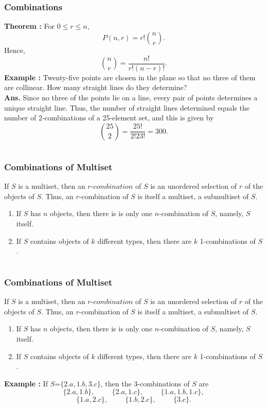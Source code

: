\documentclass{beamer}
\begin{document}
\section{}
 \begin{frame}
\frametitle{Combinations}
{\bf Theorem :} For  $ 0 \le r \le n,$
$$P(n,r)=r!{\binom{n}{r}}.$$ 
Hence,  $$\binom{n}{r} = \frac{n!}{r!(n-r)!}.$$
\pause
{\bf Example :} Twenty-five points are chosen in the plane so that no three of them are collinear. How many straight lines do they determine?\\
 {\bf Ans.} Since no three of the points lie on a line, every pair of points determines a unique straight line. Thus, the number of straight lines determined equals the number of 2-combinations of a 25-element set, and this is given by
   $$\binom{25}{2}=\frac{25!}{2!23!}=300.$$
\end{frame}

\section{}
 \begin{frame}
\frametitle{Combinations of Multiset}
If $S$ is a multiset, then an $r$-$combination$ of $S$ is an unordered selection of $r$ of the objects of $S$. Thus, an $r$-combination  of $S$ is itself a multiset, a submultiset of $S$.
\begin{enumerate}
\item If $S$ has $n$ objects, then there is is only one $n$-combination of $S$, namely, $S$ itself.
\item If $S$ contains objects of $k$ different types, then there are $k$ 1-combinations of $S$.
\end{enumerate}
\end{frame}

\section{}
 \begin{frame}
\frametitle{Combinations of Multiset}
If $S$ is a multiset, then an $r$-$combination$ of $S$ is an unordered selection of $r$ of the objects of $S$. Thus, an $r$-combination  of $S$ is itself a multiset, a submultiset of $S$.
\begin{enumerate}
\item If $S$ has $n$ objects, then there is is only one $n$-combination of $S$, namely, $S$ itself.
\item If $S$ contains objects of $k$ different types, then there are $k$ 1-combinations of $S$.
\end{enumerate}
{\bf Example :} If $S$=$\{2.a, 1.b, 3.c \}$, then the 3-combinations of $S$ are 
$$\{2.a,1.b\},\hspace{1cm}\{2.a,1.c\},\hspace{1cm}\{1.a,1.b,1.c\},$$
$$\{1.a,2.c\},\hspace{1cm}\{1.b,2.c\},\hspace{1cm}\{3.c\}.$$
\end{frame}
\end{document}
